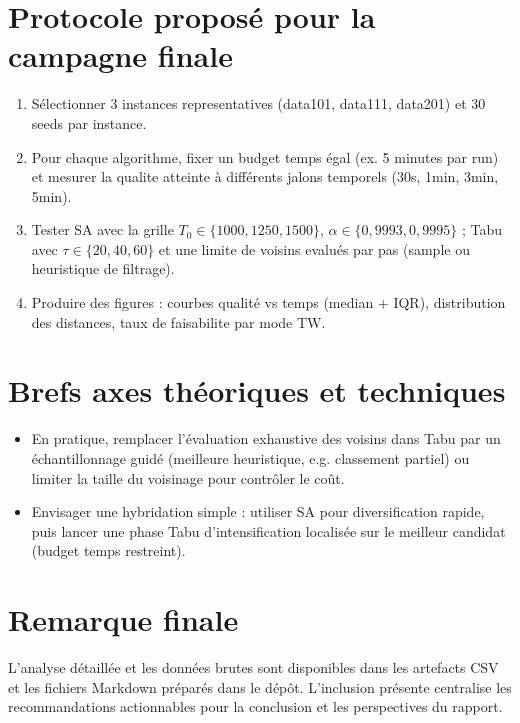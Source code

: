 \section*{Protocole proposé pour la campagne finale}
\begin{enumerate}[leftmargin=1.2cm]
  \item Sélectionner 3 instances representatives (data101, data111, data201) et 30 seeds par instance.
  \item Pour chaque algorithme, fixer un budget temps égal (ex. 5 minutes par run) et mesurer la qualite atteinte à différents jalons temporels (30s, 1min, 3min, 5min).
  \item Tester SA avec la grille $T_0\in\{1000,1250,1500\}$, $\alpha\in\{0{,}9993,0{,}9995\}$ ; Tabu avec $\tau\in\{20,40,60\}$ et une limite de voisins evalués par pas (sample ou heuristique de filtrage).
  \item Produire des figures : courbes qualité vs temps (median + IQR), distribution des distances, taux de faisabilite par mode TW.
\end{enumerate}

\section*{Brefs axes théoriques et techniques}
\begin{itemize}[leftmargin=1.2cm]
  \item En pratique, remplacer l'évaluation exhaustive des voisins dans Tabu par un échantillonnage guidé (meilleure heuristique, e.g. classement partiel) ou limiter la taille du voisinage pour contrôler le coût.
  \item Envisager une hybridation simple : utiliser SA pour diversification rapide, puis lancer une phase Tabu d'intensification localisée sur le meilleur candidat (budget temps restreint).
\end{itemize}

\section*{Remarque finale}
L'analyse détaillée et les données brutes sont disponibles dans les artefacts CSV et les fichiers Markdown préparés dans le dépôt. L'inclusion présente centralise les recommandations actionnables pour la conclusion et les perspectives du rapport.
